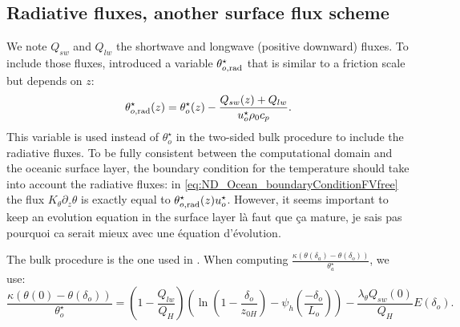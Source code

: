 \subsection{Radiative fluxes, another surface flux scheme}
\label{sec:ND_Ocean_radiativeFluxes}
We note $Q_{sw}$ and $Q_{lw}$ the shortwave and longwave (positive
downward) fluxes.
To include those fluxes, \cite{pelletier_two-sided_2021} introduced
a variable $\theta^\star_{o, \rm rad}$
that is similar to a friction scale but depends on $z$:
\begin{equation}
\theta^\star_{o, \rm rad}(z) =
	\theta^\star_{o}(z) -
	\frac{Q_{sw}(z) + Q_{lw}}{u^{\star}_o\rho_0 c_p}.
\end{equation}
This variable is used instead of $\theta^\star_{o}$
in the two-sided bulk procedure to include the radiative fluxes.
To be fully consistent between the computational domain and
the oceanic surface layer, the boundary condition for the temperature
should take into account the radiative fluxes: in
\eqref{eq:ND_Ocean_boundaryConditionFVfree} the flux
$K_\theta \partial_z \theta$ is exactly equal to
$\theta^\star_{o, \rm rad}(z) u^\star_{o}$.
However, it seems important to keep an evolution equation
in the surface layer {\color{red} là faut que ça mature,
je sais pas pourquoi ca serait mieux avec une équation d'évolution}.
%
\par
The bulk procedure is the one used in
\citep{pelletier_two-sided_2021}.
When computing
$\frac{\kappa (\theta(\delta_a) - \theta(\delta_o))}
	{\theta_a^{\star}}$,
	we use:
\begin{equation}
	\label{eq:ND_Ocean_skinbulk}
	\frac{\kappa (\theta(0) - \theta(\delta_o))}
	{\theta_o^{\star}} = (1 -
	\frac{Q_{lw}}{Q_H})
	\left(\ln (1 - \frac{\delta_o}{z_{0H}}) -
	\psi_h(\frac{-\delta_o}{L_o})\right)
	- \frac{\lambda_\theta Q_{sw}(0)}
	{Q_H} E(\delta_o).
\end{equation}
